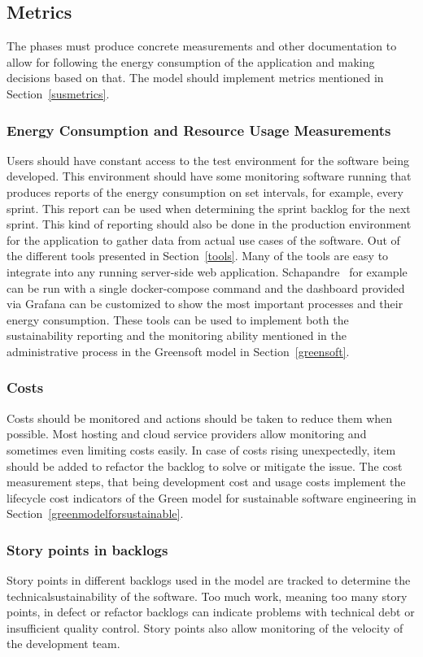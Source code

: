 \subsection{Metrics}
The phases must produce concrete measurements and other documentation to allow for following the energy consumption of the application and making decisions based on that. The model should implement metrics mentioned in Section~\ref{susmetrics}.

\subsubsection{Energy Consumption and Resource Usage Measurements}
Users should have constant access to the test environment for the software being developed. This environment should have some monitoring software running that produces reports of the energy consumption on set intervals, for example, every sprint. This report can be used when determining the sprint backlog for the next sprint. This kind of reporting should also be done in the production environment for the application to gather data from actual use cases of the software. Out of the different tools presented in Section~\ref{tools}. Many of the tools are easy to integrate into any running server-side web application. Schapandre~\cite{scaphandre} for example can be run with a single docker-compose command and the dashboard provided via Grafana can be customized to show the most important processes and their energy consumption. These tools can be used to implement both the sustainability reporting and the monitoring ability mentioned in the administrative process in the Greensoft model in Section~\ref{greensoft}.

\subsubsection{Costs}
Costs should be monitored and actions should be taken to reduce them when possible. Most hosting and cloud service providers allow monitoring and sometimes even limiting costs easily. In case of costs rising unexpectedly, item should be added to refactor the backlog to solve or mitigate the issue. The cost measurement steps, that being development cost and usage costs implement the lifecycle cost indicators of the Green model for sustainable software engineering in Section~\ref{greenmodelforsustainable}.

\subsubsection{Story points in backlogs}
Story points in different backlogs used in the model are tracked to determine the \gls{technicalsustainability} of the software. Too much work, meaning too many story points, in defect or refactor backlogs can indicate problems with technical debt or insufficient quality control. Story points also allow monitoring of the velocity of the development team.

